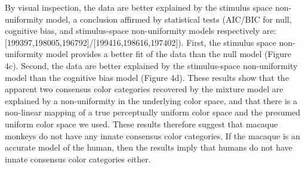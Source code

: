 \documentclass[9pt,biorxiv,lineno,onehalfspacing]{lapreprint}
\begin{document}
\begin{refsection}
By visual inspection, the data are better explained by the stimulus space non-uniformity model, a conclusion affirmed by statistical tests (AIC/BIC for null, cognitive bias, and stimulus-space non-uniformity models respectively are: [199397,198005,196792]/[199416,198616,197402]). 
First, the stimulus space non-uniformity model provides a better fit of the data than the null model (Figure 4c). 
Second, the data are better explained by the stimulus-space non-uniformity model than the cognitive bias model (Figure 4d). 
These results show that the apparent two consensus color categories recovered by the mixture model are explained by a non-uniformity in the underlying color space, and that there is a non-linear mapping of a true perceptually uniform color space and the presumed uniform color space we used. 
These results therefore suggest that macaque monkeys do not have any innate consensus color categories. 
If the macaque is an accurate model of the human, then the results imply that humans do not have innate consensus color categories either. 


\end{refsection}
\end{document}
